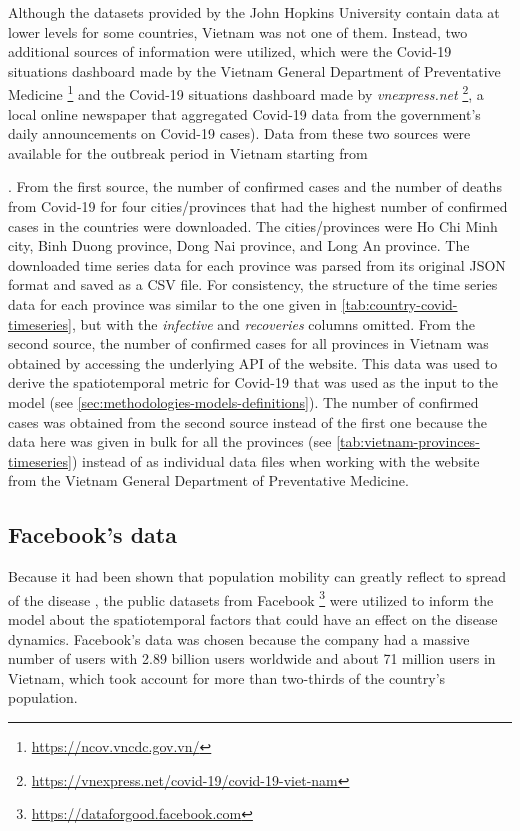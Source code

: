 Although the datasets provided by the John Hopkins University contain data at lower levels for some countries, Vietnam was not one of them.
Instead, two additional sources of information were utilized, which were the Covid-19 situations dashboard made by the Vietnam General Department of Preventative Medicine \footnote{\url{https://ncov.vncdc.gov.vn/}} and the Covid-19 situations dashboard made by \textit{vnexpress.net} \footnote{\url{https://vnexpress.net/covid-19/covid-19-viet-nam}}, a local online newspaper that aggregated Covid-19 data from the government's daily announcements on Covid-19 cases).
Data from these two sources were available for the outbreak period in Vietnam starting from \date{27th April 2021}.
From the first source, the number of confirmed cases and the number of deaths from Covid-19 for four cities/provinces that had the highest number of confirmed cases in the countries were downloaded.
The cities/provinces were Ho Chi Minh city, Binh Duong province, Dong Nai province, and Long An province.
The downloaded time series data for each province was parsed from its original \gls{JSON} format and saved as a \gls{CSV} file.
For consistency, the structure of the time series data for each province was similar to the one given in \autoref{tab:country-covid-timeseries}, but with the \textit{infective} and \textit{recoveries} columns omitted.
From the second source, the number of confirmed cases for all provinces in Vietnam was obtained by accessing the underlying \gls{API} of the website.
This data was used to derive the spatiotemporal metric for Covid-19 that was used as the input to the model (see \autoref{sec:methodologies-models-definitions}).
The number of confirmed cases was obtained from the second source instead of the first one because the data here was given in bulk for all the provinces (see \autoref{tab:vietnam-provinces-timeseries}) instead of as individual data files when working with the website from the Vietnam General Department of Preventative Medicine.

\subsection{Facebook's data}
\label{sec:methodologies-data-mobility-data}

Because it had been shown that population mobility can greatly reflect to spread of the disease \cite{changMobilityNetworkModels2021,liSubstantialUndocumentedInfection2020,ihmecovid-19forecastingteamModelingCOVID19Scenarios2021}, the public datasets from Facebook \footnote{\url{https://dataforgood.facebook.com}} were utilized to inform the model about the spatiotemporal factors that could have an effect on the disease dynamics.
Facebook's data was chosen because the company had a massive number of users with 2.89 billion users worldwide and about 71 million users in Vietnam, which took account for more than two-thirds of the country's population.

